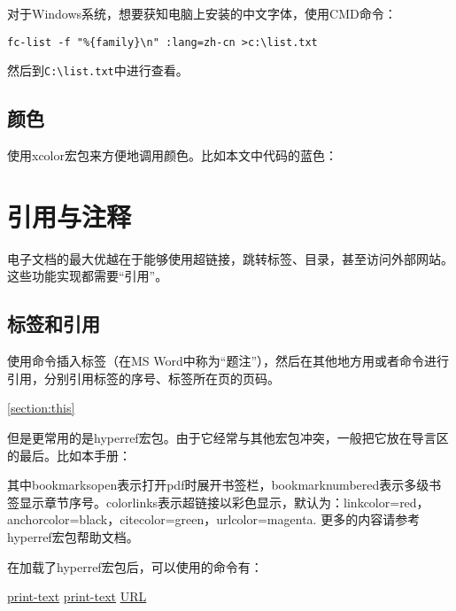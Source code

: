 {对于Windows系统，想要获知电脑上安装的中文字体，使用CMD命令：
\begin{verbatim}
fc-list -f "%{family}\n" :lang=zh-cn >c:\list.txt
\end{verbatim}

然后到\verb|C:\list.txt|中进行查看。

\subsection{颜色}
使用xcolor宏包来方便地调用颜色。比如本文中代码的蓝色：
\begin{latex}{}
\usepackage{xcolor}
{\color{color-name}{text}}
\end{latex}

\section{引用与注释}
电子文档的最大优越在于能够使用超链接，跳转标签、目录，甚至访问外部网站。这些功能实现都需要“引用”。
\subsection{标签和引用}
使用\latexline{\\label}命令插入标签（在MS Word中称为“题注”），然后在其他地方用\latexline{\\ref}或者\latexline{\\pageref}命令进行引用，分别引用标签的序号、标签所在页的页码。
\begin{latex}{}
\label{section:this}
\ref{section:this}
\pageref{section:this}
\end{latex}

但是更常用的是hyperref宏包。由于它经常与其他宏包冲突，一般把它放在导言区的最后。比如本手册：
\begin{latex}{}
\usepackage[colorlinks,bookmarksopen=true,
bookmarksnumbered=true]{hyperref}
\end{latex}

其中bookmarksopen表示打开pdf时展开书签栏，bookmarknumbered表示多级书签显示章节序号。colorlinks表示超链接以彩色显示，默认为：linkcolor=red，anchorcolor=black，citecolor=green，urlcolor=magenta. 更多的内容请参考hyperref宏包帮助文档。

在加载了hyperref宏包后，可以使用的命令有：
\begin{latex}{}
\hyperref[label-name]{print-text}
\href{URL}{print-text}
\url{URL}
\end{latex}

}
